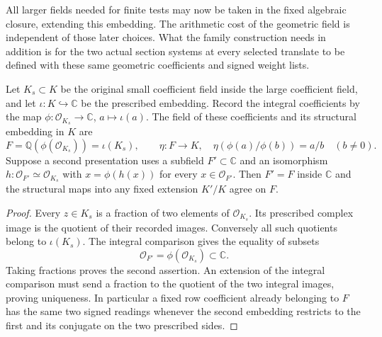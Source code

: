 All larger fields needed for finite tests may now be taken in the
fixed algebraic closure, extending this embedding. The arithmetic
cost of the geometric field is independent of those later choices.
What the family construction needs in addition is for the two actual
section systems at every selected translate to be defined with these
same geometric coefficients and signed weight lists.


\begin{auxlemma}\label{lem:original-marked-pel-field}
Let \(K_s\subset K\) be the original small coefficient field inside the
large coefficient field, and let \(\iota:K\hookrightarrow\mathbb C\)
be the prescribed embedding. Record the integral coefficients by the
map \(\phi:\mathcal O_{K_s}\to\mathbb C\), \(a\mapsto\iota(a)\).
The field of these coefficients and its structural embedding in \(K\)
are
\[
       F=\mathbb Q(\phi(\mathcal O_{K_s}))=\iota(K_s),
       \qquad \eta:F\longrightarrow K,\quad
               \eta(\phi(a)/\phi(b))=a/b\quad(b\ne0).
\]
Suppose a second presentation uses a subfield \(F'\subset\mathbb C\)
and an isomorphism \(h:\mathcal O_{F'}\simeq\mathcal O_{K_s}\)
with \(x=\phi(h(x))\) for every \(x\in\mathcal O_{F'}\).
Then \(F'=F\) inside \(\mathbb C\) and the structural maps into any
fixed extension \(K'/K\) agree on \(F\).
\end{auxlemma}
\begin{proof}
Every \(z\in K_s\) is a fraction of two elements of
\(\mathcal O_{K_s}\). Its prescribed complex image is the quotient of
their recorded images. Conversely all such quotients belong to
\(\iota(K_s)\). The integral comparison gives the equality of subsets
\[
          \mathcal O_{F'}=\phi(\mathcal O_{K_s})\subset\mathbb C .
\]
Taking fractions proves the second assertion. An extension of the
integral comparison must send a fraction to the quotient of the two
integral images, proving uniqueness. In particular a fixed row
coefficient already belonging to \(F\) has the same two signed
readings whenever the second embedding restricts to the first and
its conjugate on the two prescribed sides.
\end{proof}

